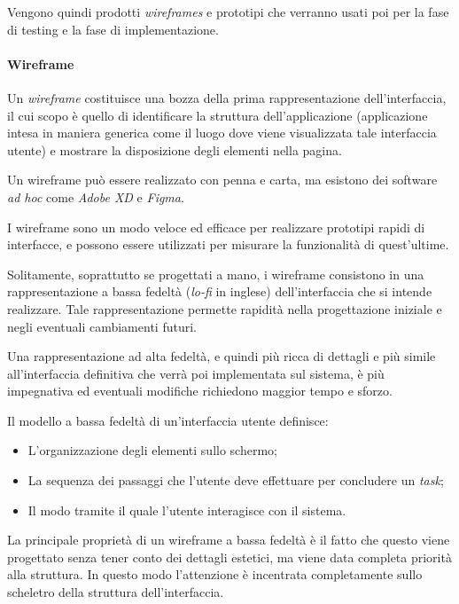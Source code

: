 Vengono quindi prodotti \emph{wireframes} e prototipi che verranno usati poi per la fase di testing e la fase di implementazione.

\hypertarget{wireframe}{%
\paragraph{Wireframe}\label{wireframe}}

Un \emph{wireframe} costituisce una bozza della prima rappresentazione dell'interfaccia, il cui scopo è quello di identificare la struttura dell'applicazione (applicazione intesa in maniera generica come il luogo dove viene visualizzata tale interfaccia utente) e mostrare la disposizione degli elementi nella pagina. \cite{wireframe}

Un wireframe può essere realizzato con penna e carta, ma esistono dei software \emph{ad hoc} come \emph{Adobe XD} e \emph{Figma}.

I wireframe sono un modo veloce ed efficace per realizzare prototipi rapidi di interfacce, e possono essere utilizzati per misurare la funzionalità di quest'ultime.

Solitamente, soprattutto se progettati a mano, i wireframe consistono in una rappresentazione a bassa fedeltà (\emph{lo-fi} in inglese) dell'interfaccia che si intende realizzare. Tale rappresentazione permette rapidità nella progettazione iniziale e negli eventuali cambiamenti futuri.

Una rappresentazione ad alta fedeltà, e quindi più ricca di dettagli e più simile all'interfaccia definitiva che verrà poi implementata sul sistema, è più impegnativa ed eventuali modifiche richiedono maggior tempo e sforzo. \cite{wireframe-kit}

Il modello a bassa fedeltà di un'interfaccia utente definisce:

\begin{itemize}
    \item L'organizzazione degli elementi sullo schermo;
    \item La sequenza dei passaggi che l'utente deve effettuare per concludere un \emph{task};
    \item Il modo tramite il quale l'utente interagisce con il sistema.
\end{itemize}
La principale proprietà di un wireframe a bassa fedeltà è il fatto che questo viene progettato senza tener conto dei dettagli estetici, ma viene data completa priorità alla struttura. In questo modo l'attenzione è incentrata completamente sullo scheletro della struttura dell'interfaccia.

